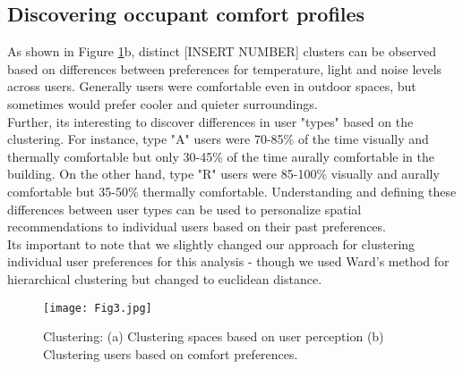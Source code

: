 \subsection{Discovering occupant comfort profiles}
 
As shown in Figure \ref{fig:clustering}b, distinct [INSERT NUMBER] clusters can be observed based on differences between preferences for temperature, light and noise levels across users. Generally users were comfortable even in outdoor spaces, but sometimes would prefer cooler and quieter surroundings.\\

Further, its interesting to discover differences in user "types" based on the clustering. For instance, type "A" users were 70-85\% of the time visually and thermally comfortable but only 30-45\% of the time aurally comfortable in the building. On the other hand, type "R" users were 85-100\% visually and aurally comfortable but 35-50\% thermally comfortable. Understanding and defining these differences between user types can be used to personalize spatial recommendations to individual users based on their past preferences.\\       

Its important to note that we slightly changed our approach for clustering individual user preferences for this analysis - though we used Ward's method for hierarchical clustering but changed to euclidean distance.   


\begin{figure}
\begin{center}
\texttt{[image: Fig3.jpg]}
\caption{Clustering: (a) Clustering spaces based on user perception (b) Clustering users based on comfort preferences.}
\label{fig:clustering}
\end{center}
\end{figure}

